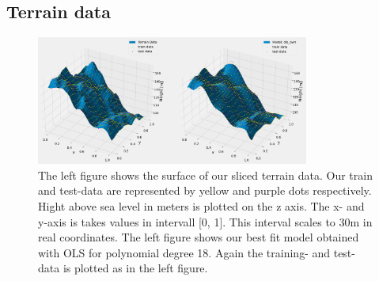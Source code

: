 \subsection{Terrain data}
\begin{figure}[H]
    \centering
    \includegraphics[width=0.8\textwidth]{Figures/terrain_data_and_model_ols_best.png}
    \caption{The left figure shows the surface of our sliced terrain data. Our
    train and test-data are represented by yellow and purple dots respectively.
Hight above sea level in meters is plotted on the z axis. The x- and y-axis is
takes values in intervall [0, 1]. This interval scales to 30m in real
coordinates. The left figure shows our best fit model obtained with OLS for
polynomial degree 18. Again the training- and test-data is plotted as in the
left figure.}  
\end{figure}

